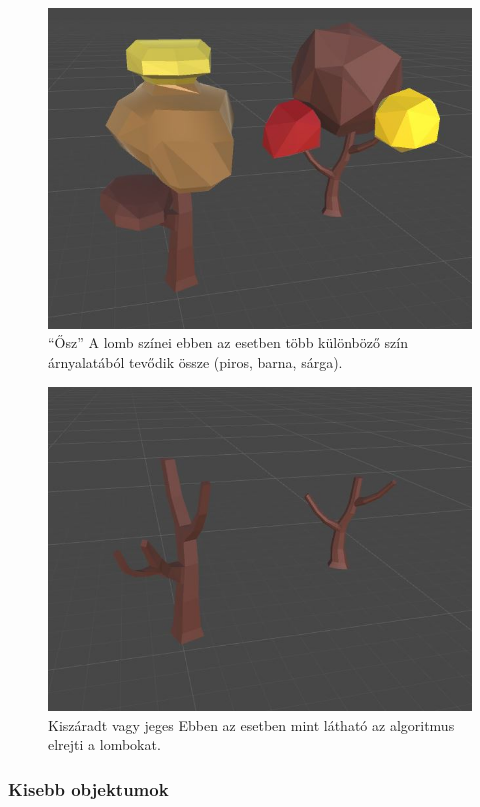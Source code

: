 \begin{figure}[h!]
\centering
\includegraphics[scale=0.5]{kepek/img11_4_7_2.JPG}
\caption{“Ősz” A lomb színei ebben az esetben több különböző szín árnyalatából tevődik össze (piros, barna, sárga).}
\label{fig:img11_4_7_2}
\end{figure}

\begin{figure}[h!]
\centering
\includegraphics[scale=0.5]{kepek/img11_4_7_3.JPG}
\caption{Kiszáradt vagy jeges Ebben az esetben mint látható az algoritmus elrejti a lombokat.}
\label{fig:img11_4_7_3}
\end{figure}

\subsubsection{Kisebb objektumok}

